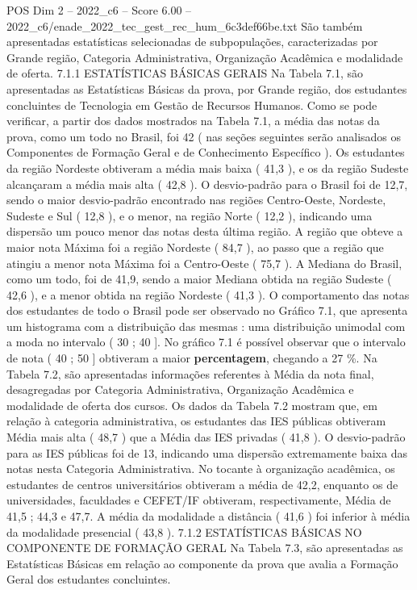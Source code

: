 \begin{textsample}{POS Dim 2 – 2022\_c6 – Score 6.00 – 2022\_c6/enade\_2022\_tec\_gest\_rec\_hum\_6c3def66be.txt}
São também apresentadas estatísticas selecionadas de subpopulações, caracterizadas por Grande região, Categoria Administrativa, Organização Acadêmica e modalidade de oferta. 7.1.1 ESTATÍSTICAS BÁSICAS GERAIS Na Tabela 7.1, são apresentadas as Estatísticas Básicas da prova, por Grande região, dos estudantes concluintes de Tecnologia em Gestão de Recursos Humanos.
Como se pode verificar, a partir dos dados mostrados na Tabela 7.1, a média das notas da prova, como um todo no Brasil, foi 42 ( nas seções seguintes serão analisados os Componentes de Formação Geral e de Conhecimento Específico ).
Os estudantes da região Nordeste obtiveram a média mais baixa ( 41,3 ), e os da região Sudeste alcançaram a média mais alta ( 42,8 ).
O desvio-padrão para o Brasil foi de 12,7, sendo o maior desvio-padrão encontrado nas regiões Centro-Oeste, Nordeste, Sudeste e Sul ( 12,8 ), e o menor, na região Norte ( 12,2 ), indicando uma dispersão um pouco menor das notas desta última região.
A região que obteve a maior nota Máxima foi a região Nordeste ( 84,7 ), ao passo que a região que atingiu a menor nota Máxima foi a Centro-Oeste ( 75,7 ).
A Mediana do Brasil, como um todo, foi de 41,9, sendo a maior Mediana obtida na região Sudeste ( 42,6 ), e a menor obtida na região Nordeste ( 41,3 ).
O comportamento das notas dos estudantes de todo o Brasil pode ser observado no Gráfico 7.1, que apresenta um histograma com a distribuição das mesmas : uma distribuição unimodal com a moda no intervalo ( 30 ; 40 ].
No gráfico 7.1 é possível observar que o intervalo de nota ( 40 ; 50 ] obtiveram a maior \textbf{percentagem}, chegando a 27 \%.
Na Tabela 7.2, são apresentadas informações referentes à Média da nota final, desagregadas por Categoria Administrativa, Organização Acadêmica e modalidade de oferta dos cursos.
Os dados da Tabela 7.2 mostram que, em relação à categoria administrativa, os estudantes das IES públicas obtiveram Média mais alta ( 48,7 ) que a Média das IES privadas ( 41,8 ).
O desvio-padrão para as IES públicas foi de 13, indicando uma dispersão extremamente baixa das notas nesta Categoria Administrativa.
No tocante à organização acadêmica, os estudantes de centros universitários obtiveram a média de 42,2, enquanto os de universidades, faculdades e CEFET/IF obtiveram, respectivamente, Média de 41,5 ; 44,3 e 47,7.
A média da modalidade a distância ( 41,6 ) foi inferior à média da modalidade presencial ( 43,8 ). 7.1.2 ESTATÍSTICAS BÁSICAS NO COMPONENTE DE FORMAÇÃO GERAL Na Tabela 7.3, são apresentadas as Estatísticas Básicas em relação ao componente da prova que avalia a Formação Geral dos estudantes concluintes.

\end{textsample}
